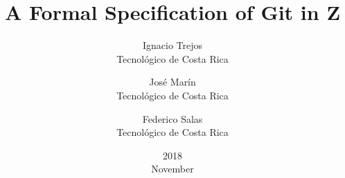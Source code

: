 \documentclass[titlepage]{article}
\title{A Formal Specification of Git in Z}
\date{2018\\ November}
\author{Ignacio Trejos\\ Tecnológico de Costa Rica
\and José Marín\\ Tecnológico de Costa Rica
\and Federico Salas\\ Tecnológico de Costa Rica}
\begin{document}
\maketitle

\tableofcontents
\newpage















\nocite{*}


\end{document}

